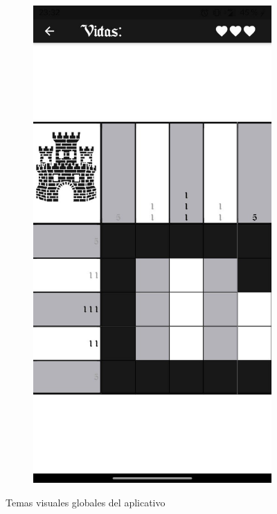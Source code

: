 \begin{figure}[H]
\begin{subfigure}[b]{0.22\linewidth}
        \includegraphics[width=\linewidth]{images/man15.jpeg}
      \end{subfigure}
    \caption{Temas visuales globales del aplicativo}
    \label{fig:man7}
  \end{figure}